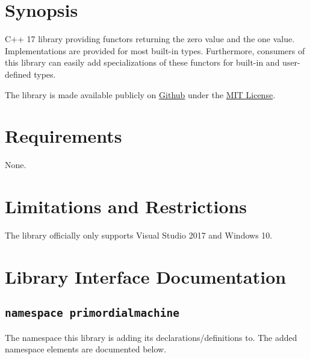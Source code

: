 \documentclass[oneside]{book}
\begin{document}
\frontmatter

\begin{titlepage}
\maketitle
\end{titlepage}

\tableofcontents
{}

\mainmatter

\chapter{Synopsis}
C++ 17 library providing functors returning the zero value and the one value.\newline
\noindent{}Implementations are provided for most built-in types.\newline
\noindent{}Furthermore, consumers of this library can easily add specializations of these functors for built-in and user-defined types.\newline

\noindent{}The library is made available publicly on
\href{\GetLibraryRepository}{Github}
under the
\href{\GetLibraryRepository/blob/master/LICENSE}{MIT License}.

\chapter{Requirements}
None.

\chapter{Limitations and Restrictions}
The library officially only supports Visual Studio 2017 and Windows 10.





\chapter{Library Interface Documentation}

\section{\texttt{namespace primordialmachine}}
The namespace this library is adding its declarations/definitions to.
The added namespace elements are documented below.





\end{document}
